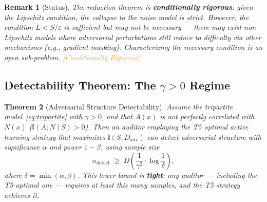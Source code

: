 \documentclass[12pt,a4paper]{article}
\newtheorem{theorem}{Theorem}[section]
\newtheorem{remark}[theorem]{Remark}
\newcommand{\conditionallyrigorous}{\textcolor{orange}{\small\textsf{[Conditionally Rigorous]}}}
\newcommand{\I}{\mathbb{I}}
\begin{document}
\begin{remark}[Status]
The reduction theorem is \textbf{conditionally rigorous}: given the Lipschitz
condition, the collapse to the noise model is strict.  However, the
condition $L < S/\varepsilon$ is \emph{sufficient but may not be necessary}
— there may exist non-Lipschitz models where adversarial perturbations still
reduce to difficulty via other mechanisms (e.g., gradient masking).
Characterizing the \emph{necessary} condition is an open sub-problem.
\conditionallyrigorous
\end{remark}

\subsection{Detectability Theorem: The $\gamma > 0$ Regime}

\begin{theorem}[Adversarial Structure Detectability]
\label{thm:detectability}
Assume the tripartite model~\eqref{eq:tripartite} with $\gamma > 0$, and
that $A(x)$ is not perfectly correlated with $N(x)$
($\I(A; N \mid S) > 0$).  Then an auditor employing the T5 optimal active
learning strategy that maximizes $\I(S; D_{\mathrm{adv}})$ can detect
adversarial structure with significance $\alpha$ and power $1-\beta$, using
sample size
\begin{equation}\label{eq:sample-complexity}
    n_{\mathrm{detect}}
    \;\geq\; \Omega\!\left(\frac{1}{\gamma^2} \cdot
    \log\frac{1}{\delta}\right),
\end{equation}
where $\delta = \min(\alpha, \beta)$.  This lower bound is \textbf{tight}:
any auditor — including the T5-optimal one — requires at least this many
samples, and the T5 strategy achieves it.
\end{theorem}
\end{document}
